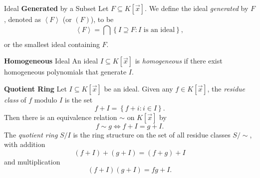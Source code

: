 \documentclass[11pt]{article}
\begin{document}
    \begin{definition}{Ideal \textbf{Generated} by a Subset}
        Let $F\subseteq K\left[ \vec{x} \right]$. We define the ideal \emph{generated} by $F$, denoted as $\left< F \right>$ (or $\left( F \right)$), to be
        \begin{equation*}
            \left< F \right> = \bigcap^{}_{} \left\lbrace I\supseteq F: \text{$I$ is an ideal} \right\rbrace, 
        \end{equation*}
        or the smallest ideal containing $F$.
    \end{definition}
    
    \begin{definition}{\textbf{Homogeneous} Ideal}
        An ideal $I\subseteq K\left[ \vec{x} \right]$ is \emph{homogeneous} if there exist homogeneous polynomials that generate $I$.\footnotemark[1]
        
        \noindent
        \begin{minipage}{\textwidth}
        \end{minipage}
    \end{definition}
    
    \begin{definition}{\textbf{Quotient Ring}}
        Let $I\subseteq K\left[ \vec{x} \right]$ be an ideal. Given any $f\in K\left[ \vec{x} \right]$, the \emph{residue class} of $f$ modulo $I$ is the set
        \begin{equation*}
            f+I = \left\lbrace f+i: i\in I \right\rbrace.
        \end{equation*}
        Then there is an equivalence relation $\sim$ on $K\left[ \vec{x} \right]$ by
        \begin{equation*}
            f\sim g \iff f+I = g+I.
        \end{equation*}
        The \emph{quotient ring} $S /I$ is the ring structure on the set of all residue classes $S /\sim$, with addition
        \begin{equation*}
            \left( f+I \right) + \left( g+I \right) = \left( f+g \right) + I
        \end{equation*}
        and multiplication
        \begin{equation*}
            \left( f+I \right)\left( g+I \right) = fg+I.
        \end{equation*}
    \end{definition}
    
\end{document}
